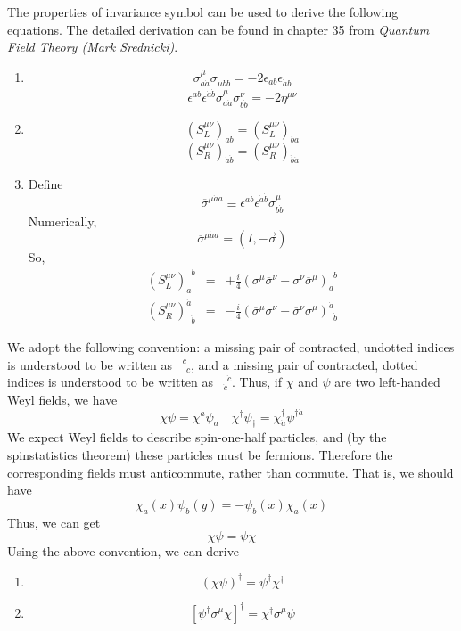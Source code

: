 The properties of invariance symbol can be used to derive the following equations. The detailed derivation can be found in chapter 35 from \emph{Quantum Field Theory (Mark Srednicki)}.

\begin{newprop}
\begin{enumerate}
\item 
\[\sigma^{\mu}_{a\dot{a}} \sigma_{\mu b\dot{b}} = -2\epsilon_{ab} \epsilon_{\dot{a}\dot{b}}\]
\[\epsilon^{ab}\epsilon^{\dot{a}\dot{b}} \sigma^{\mu}_{a\dot{a}} \sigma^{\nu}_{b\dot{b}} = -2\eta^{\mu\nu}\]
\item \[(S_L^{\mu\nu})_{ab} = (S_L^{\mu\nu})_{ba}\]
\[(S_R^{\mu\nu})_{\dot{a}\dot{b}} = (S_R^{\mu\nu})_{\dot{b}\dot{a}}\]
\item Define
\[\overline{\sigma}^{\mu \dot{a} a} \equiv \epsilon^{ab} \epsilon^{\dot{a}\dot{b}} \sigma^{\mu}_{b\dot{b}}\]
Numerically,
\[\overline{\sigma}^{\mu \dot{a} a} = (I , -\vec{\sigma})\]
So,
\begin{eqnarray}
(S_L^{\mu\nu})_a^{\phantom{a}b} &=& + \frac{i}{4} (\sigma^{\mu} \overline{\sigma}^{\nu} - \sigma^{\nu} \overline{\sigma}^{\mu})_a^{\phantom{a}b} \nonumber \\
(S_R^{\mu\nu})^{\dot{a}}_{\phantom{\dot{a}} \dot{b}} &=& - \frac{i}{4}(\overline{\sigma}^{\mu}\sigma^{\nu} - \overline{\sigma}^{\nu} \sigma^{\mu})^{\dot{a}}_{\phantom{\dot{a}} \dot{b}} \nonumber
\end{eqnarray}
\end{enumerate}
\end{newprop}
We adopt the following convention: a missing pair of contracted,
undotted indices is understood to be written as $\phantom{1}^c_{\phantom{c}c}$, and a missing pair of
contracted, dotted indices is understood to be written as $\phantom{1}_{\dot{c}}^{\phantom{c}\dot{c}}$. Thus, if $\chi$ and
$\psi$ are two left-handed Weyl fields, we have
\[\chi \psi = \chi^{a}\psi_{a} \quad \chi^{\dagger} \psi_{\dagger} = \chi^{\dagger}_{\dot{a}} \psi^{\dagger \dot{a}}\]
We expect Weyl fields to describe spin-one-half particles, and (by the spinstatistics theorem) these particles must be fermions. Therefore the corresponding fields must anticommute, rather than commute. That is, we should have
\[\chi_a(x) \psi_b(y) = - \psi_b(x) \chi_a(x)\]
Thus, we can get
\[\chi\psi = \psi\chi\]
Using the above convention, we can derive
\begin{newprop}
\begin{enumerate}
\item \[(\chi\psi)^{\dagger} = \psi^{\dagger}\chi^{\dagger}\]
\item \[[\psi^{\dagger} \overline{\sigma}^{\mu} \chi]^{\dagger} = \chi^{\dagger} \overline{\sigma}^{\mu} \psi\]
\end{enumerate}
\end{newprop}

